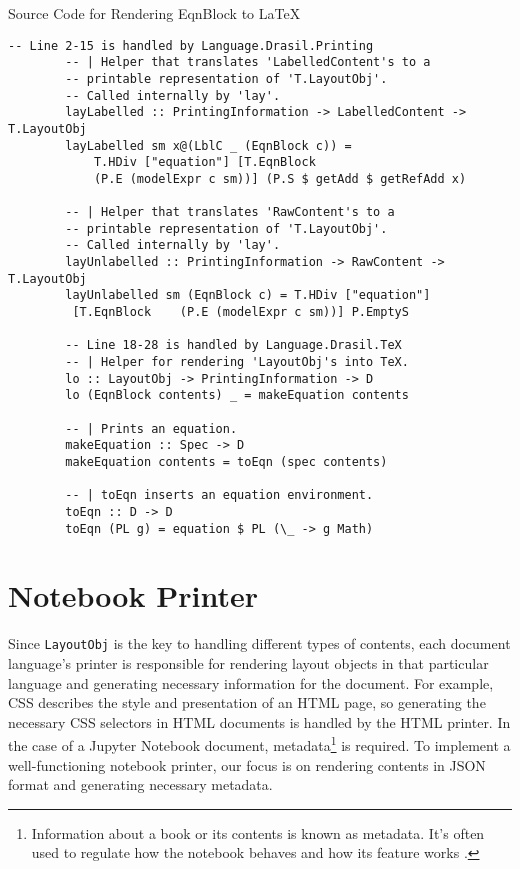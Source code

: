 \begin{listing}
	\caption{Source Code for Rendering EqnBlock to LaTeX}
	\label{code:EqnblocktoTex]}
	\begin{lstlisting}[language=haskell1]
		-- Line 2-15 is handled by Language.Drasil.Printing
		-- | Helper that translates 'LabelledContent's to a 
		-- printable representation of 'T.LayoutObj'. 
		-- Called internally by 'lay'.
		layLabelled :: PrintingInformation -> LabelledContent -> T.LayoutObj
		layLabelled sm x@(LblC _ (EqnBlock c)) = 
			T.HDiv ["equation"] [T.EqnBlock 
			(P.E (modelExpr c sm))] (P.S $ getAdd $ getRefAdd x)
		
		-- | Helper that translates 'RawContent's to a  
		-- printable representation of 'T.LayoutObj'. 
		-- Called internally by 'lay'.
		layUnlabelled :: PrintingInformation -> RawContent -> T.LayoutObj
		layUnlabelled sm (EqnBlock c) = T.HDiv ["equation"] 
		 [T.EqnBlock	(P.E (modelExpr c sm))] P.EmptyS
		
		-- Line 18-28 is handled by Language.Drasil.TeX
		-- | Helper for rendering 'LayoutObj's into TeX.
		lo :: LayoutObj -> PrintingInformation -> D
		lo (EqnBlock contents) _ = makeEquation contents
		
		-- | Prints an equation.
		makeEquation :: Spec -> D
		makeEquation contents = toEqn (spec contents)
		
		-- | toEqn inserts an equation environment.
		toEqn :: D -> D
		toEqn (PL g) = equation $ PL (\_ -> g Math)
	\end{lstlisting}
\end{listing}

\section{Notebook Printer}
Since \texttt{LayoutObj} is the key to handling different types of contents, 
each document language's printer is responsible for rendering layout objects in 
that particular language and generating necessary information for the document. 
For example, CSS describes the style and presentation of an HTML page, so 
generating the necessary CSS selectors in HTML documents is handled by the HTML 
printer. In the case of a Jupyter Notebook document, 
metadata\footnote{Information about a book or its contents is known as 
metadata. It's often used to regulate how the notebook behaves and how its 
feature works \cite{notebookmetadata}.} is required. To implement a 
well-functioning notebook printer, our focus is on rendering contents in JSON 
format and generating necessary metadata.

